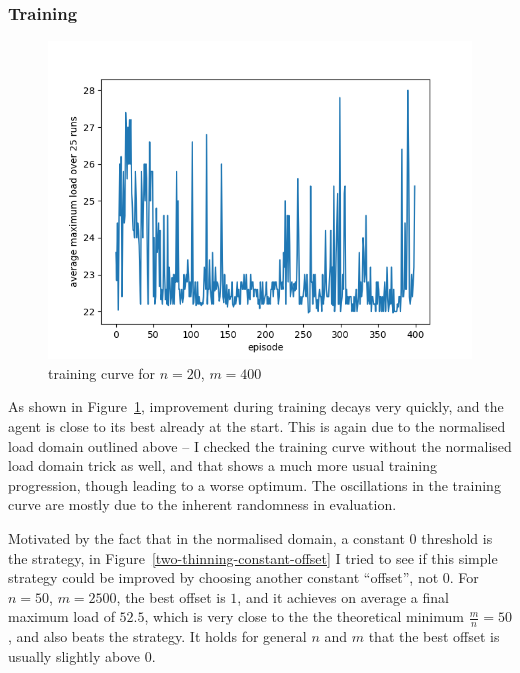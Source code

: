\subsubsection*{Training}


\begin{figure}[h]
    \centering
    \includegraphics[scale=0.6]{Chapter4/Figs/training_progression_20_400.png}
    \caption{\TwoThinning training curve for $n=20$, $m=400$}
     \label{two-thinning-training-curve}
\end{figure}

As shown in Figure~\ref{two-thinning-training-curve}, improvement during training decays very quickly, and the agent is close to its best already at the start. This is again due to the normalised load domain outlined above -- I checked the training curve without the normalised load domain trick as well, and that shows a much more usual training progression, though leading to a worse optimum. The oscillations in the training curve are mostly due to the inherent randomness in evaluation.


Motivated by the fact that in the normalised domain, a constant $0$ threshold is the \MeanThinning strategy, in Figure~\ref{two-thinning-constant-offset} I tried to see if this simple \MeanThinning strategy could be improved by choosing another constant ``offset'', not $0$. For $n=50$, $m=2500$, the best offset is $1$, and it achieves on average a final maximum load of $52.5$, which is very close to the the theoretical minimum $\frac{m}{n}=50$, and also beats the \DQN strategy. It holds for general $n$ and $m$ that the best offset is usually slightly above $0$.

